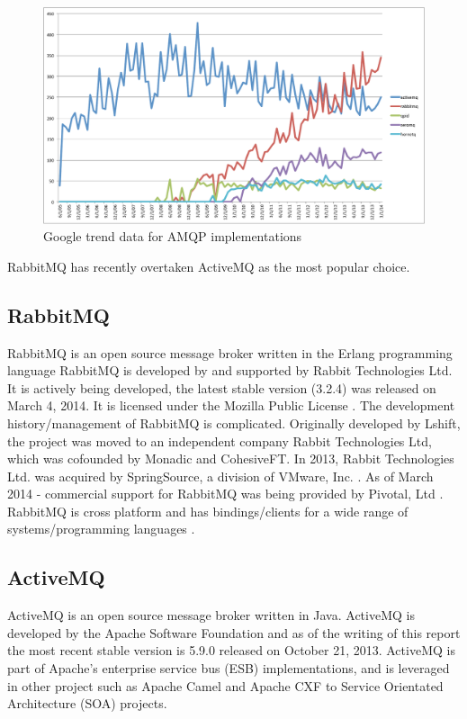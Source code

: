 \documentclass{thesis}
\begin{document}
\begin{figure}[h]
\centering
\includegraphics[scale=.5]{broker_popularity}  
\caption{Google trend data for AMQP implementations}
\end{figure}

RabbitMQ has recently overtaken ActiveMQ as the most popular choice.

\subsection{RabbitMQ}
RabbitMQ is an open source message broker written in the Erlang programming language \cite{RABBITMQ} RabbitMQ is developed by and supported by Rabbit Technologies Ltd.  It is actively being developed, the latest stable version (3.2.4) was released on March 4, 2014.  It is licensed under the Mozilla Public License \cite{rabbitmq-wikipedia}.  The development history/management of RabbitMQ is complicated.  Originally developed by Lshift, the project was moved to an independent company Rabbit Technologies Ltd, which was cofounded by Monadic and CohesiveFT.  In 2013, Rabbit Technologies Ltd. was acquired by SpringSource, a division of VMware, Inc. \cite{LSHIFT}.  As of March 2014 - commercial support for RabbitMQ was being provided by Pivotal, Ltd \cite{PIVOTAL}.  RabbitMQ is cross platform and has bindings/clients for a wide range of systems/programming languages \cite{RABBITMQ_CLIENTS}.  

\subsection{ActiveMQ}
ActiveMQ is an open source message broker written in Java.  ActiveMQ is developed by the Apache Software Foundation and as of the writing of this report the most recent stable version is 5.9.0 released on October 21, 2013.  ActiveMQ is part of Apache's enterprise service bus (ESB) implementations, and is leveraged in other project such as Apache Camel and Apache CXF to Service Orientated Architecture (SOA) projects. 
\end{document}
